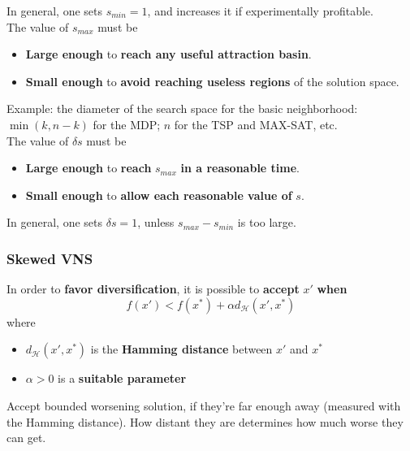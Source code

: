 In general, one sets $s_{min} = 1$, and increases it if experimentally profitable.\\

The value of $s_{max}$ must be
\begin{itemize}
	\item \textbf{Large enough} to \textbf{reach any useful attraction basin}.\\
	
	\item \textbf{Small enough} to \textbf{avoid reaching useless regions} of the solution space.\\
\end{itemize}
Example: the diameter of the search space for the basic neighborhood: $\min (k, n - k)$ for the MDP; $n$ for the TSP and MAX-SAT, etc.\\

The value of $\delta s$ must be
\begin{itemize}
	\item \textbf{Large enough} to \textbf{reach} $s_{max}$ \textbf{in a reasonable time}.\\
	
	\item \textbf{Small enough} to \textbf{allow each reasonable value of} $s$.\\
\end{itemize}

In general, one sets $\delta s = 1$, unless $s_{max} - s_{min}$ is too large.\\

\newpage

\subsubsection{Skewed VNS}
In order to \textbf{favor diversification}, it is possible to \textbf{accept} $x'$ \textbf{when}
$$ f (x') < f (x^\ast) + \alpha d_{\mathcal{H}} (x', x^\ast) $$
where
\begin{itemize}
	\item $d_{\mathcal{H}} (x', x^\ast)$ is the \textbf{Hamming distance} between $x'$ and $x^\ast$
	
	\item $\alpha > 0$ is a \textbf{suitable parameter}
\end{itemize}
Accept bounded worsening solution, if they're far enough away (measured with the Hamming distance). How distant they are determines how much worse they can get.\\

